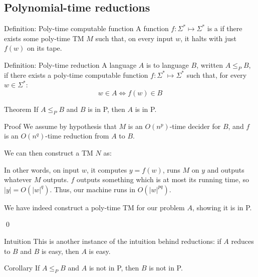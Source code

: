 \documentclass[a4paper]{article}
\begin{document}
\subsection{Polynomial-time reductions}
\begin{parag}{Definition: Poly-time computable function}
    A function $f: \Sigma^* \mapsto \Sigma^*$ is a  if there exists some poly-time TM $M$ such that, on every input $w$, it halts with just $f\left(w\right)$ on its tape.
\end{parag}

\begin{parag}{Definition: Poly-time reduction}
    A language $A$ is  to language $B$, written $A \leq_P B$, if there exists a poly-time computable function $f: \Sigma^* \mapsto \Sigma^*$ such that, for every $w \in \Sigma^*$: 
    \[w \in A \iff f\left(w\right) \in B\]
\end{parag}

\begin{parag}{Theorem}
    If $A \leq_P B$ and $B$ is in P, then $A$ is in P.

    \begin{subparag}{Proof}
        We assume by hypothesis that $M$ is an $O\left(n^p\right)$-time decider for $B$, and $f$ is an $O\left(n^q\right)$-time reduction from $A$ to $B$.

        We can then construct a TM $N$ as:

        In other words, on input $w$, it computes $y = f\left(w\right)$, runs $M$ on $y$ and outputs whatever $M$ outputs. $f$ outputs something which is at most its running time, so $\left|y\right| = O\left(\left|w\right|^q\right)$. Thus, our machine runs in $O\left(\left|w\right|^{pq}\right)$.

        We have indeed construct a poly-time TM for our problem $A$, showing it is in P.

        \qed
    \end{subparag}

    \begin{subparag}{Intuition}
        This is another instance of the intuition behind reductions: if $A$ reduces to $B$ and $B$ is easy, then $A$ is easy.
    \end{subparag}
    
\end{parag}

\begin{parag}{Corollary}
    If $A \leq_P B$ and $A$ is not in P, then $B$ is not in P.
\end{parag}
\end{document}
